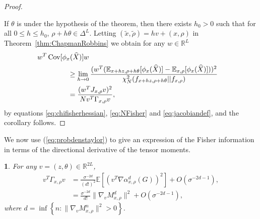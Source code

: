 \documentclass{IEEEtran}
\numberwithin{equation}{section}
\numberwithin{figure}{section}
\theoremstyle{plain}
\theoremstyle{definition}
\theoremstyle{remark}
\theoremstyle{plain}
\newtheorem{lem}[thm]{\protect\lemmaname}
\theoremstyle{remark}
\theoremstyle{plain}
\theoremstyle{plain}
\theoremstyle{remark}
\providecommand{\lemmaname}{Lemma}
\newcommand{\reals}{\mathbb{R}}
\newcommand{\RL}{\mathbb{R}^L}
\newcommand{\E}{\mathbb{E}}
\DeclareMathOperator*{\Cov}{Cov}
\newcommand{\OO}{{O}}
\newcommand{\error}{G}
\begin{document}
\begin{proof}
	\label{proof:CramerRao}
	
	If $\theta$ is under the hypothesis of the theorem, then there exists $h_0>0$ such that for all $0\le h\le h_0$, $\rho+h\theta\in \Delta^L$. Letting $(\tilde x,\tilde \rho)=hv+(x,\rho)$ in Theorem~\ref{thm:ChapmanRobbins} we obtain for any $w\in \RL$
	\begin{align*}
	w^T\Cov[\phi_x(\widehat X)]w\hspace{-30pt}\\
	&\ge \lim_{h\rightarrow 0}\frac{(w^T(\E_{x+hz,\rho+h\theta}[\phi_{x}(\widehat X)]-\E_{x,\rho}[\phi_{x}(\widehat X)]))^2}
	{\chi^2_N(f_{x+hz,\rho+h\theta}||f_{x,\rho})}\\
	&= \frac{(w^TJ_{x,\rho} v)^2}{N v^T \Gamma_{x,\rho} v},
	\end{align*}
	by equations \eqref{eq:chifisherhessian}, \eqref{eq:NFisher} and \eqref{eq:jacobiandef}, and the corollary follows.
\end{proof}

We now use (\ref{eq:probdenstaylor}) to give an expression of the Fisher information in terms of the directional derivative of the tensor moments.

\begin{lem}\label{lem:falldominoesfisher}
	For any $v=(z,\theta)\in \reals^{2L}$,
	\begin{align}\label{eq:Fisheralpha}
	v^T \Gamma_{x,\rho} v&=\frac{\sigma^{-2d}}{(d!)^2}  \E\left[\left(v^T \nabla \alpha_{x,\rho}^d(\error)\right)^2\right]+\OO(\sigma^{-2d-1}),\\
	&=\frac{\sigma^{-2d}}{d!}  \|\nabla_v M^d_{x,\rho} \|^2+\OO(\sigma^{-2d-1}), \label{eq:fisherautocorr}
	\end{align}
	where $d=\inf\left\{n: \|\nabla_v M^n_{x,\rho} \|^2>0\right\}$.
\end{lem}
\end{document}
